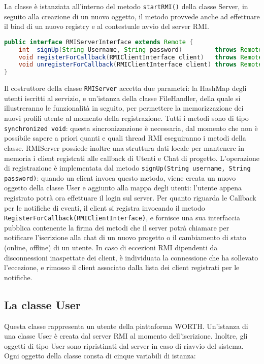 \documentclass{article}
\begin{document}
La classe è istanziata all'interno del metodo \texttt{startRMI()} della classe Server, in seguito alla creazione di un nuovo oggetto, il metodo provvede anche ad effettuare il bind di un nuovo registry e al contestuale avvio del server RMI.\newline 
\begin{lstlisting}[language=Java, caption=Interfaccia \texttt{RMIServerInterface.java}]
public interface RMIServerInterface extends Remote {
    int  signUp(String Username, String password)         throws RemoteException;
    void registerForCallback(RMIClientInterface client)   throws RemoteException;
    void unregisterForCallback(RMIClientInterface client) throws RemoteException;
}
\end{lstlisting}

Il costruttore della classe \texttt{RMIServer} accetta due parametri: la HashMap degli utenti iscritti al servizio, e un'istanza della classe FileHandler, della quale si illustreranno le funzionalità in seguito, per permettere la memorizzazione dei nuovi profili utente al momento della registrazione.
Tutti i metodi sono di tipo \texttt{synchronized void}: questa sincronizzazione è necessaria, dal momento che non è possibile sapere a priori quanti e quali thread RMI eseguiranno i metodi della classe.
RMIServer possiede inoltre una struttura dati locale per mantenere in memoria i client registrati alle callback di Utenti e Chat di progetto.
L'operazione di registrazione è implementata dal metodo \texttt{signUp(String username, String password)}: quando un client invoca questo metodo, viene creata un nuovo oggetto della classe User e aggiunto alla mappa degli utenti: l'utente appena registrato potrà ora effettuare il login sul server.
Per quanto riguarda le Callback per le notifiche di eventi, il client si registra invocando il metodo \texttt{RegisterForCallback(RMIClientInterface)}, e fornisce una sua interfaccia pubblica contenente la firma dei metodi che il server potrà chiamare per notificare l'iscrizione alla chat di un nuovo progetto o il cambiamento di stato (online, offline) di un utente. 
In caso di eccezioni RMI dipendenti da disconnessioni inaspettate dei client, è individuata la connessione che ha sollevato l'eccezione, e rimosso il client associato dalla lista dei client registrati per le notifiche.

\subsection{La classe User}
Questa classe rappresenta un utente della piattaforma WORTH. Un'istanza di una classe User è creata dal server RMI al momento dell'iscrizione. Inoltre, gli oggetti di tipo User sono ripristinati dal server in caso di riavvio del sistema.\newline
Ogni oggetto della classe consta di cinque variabili di istanza: 
\end{document}
